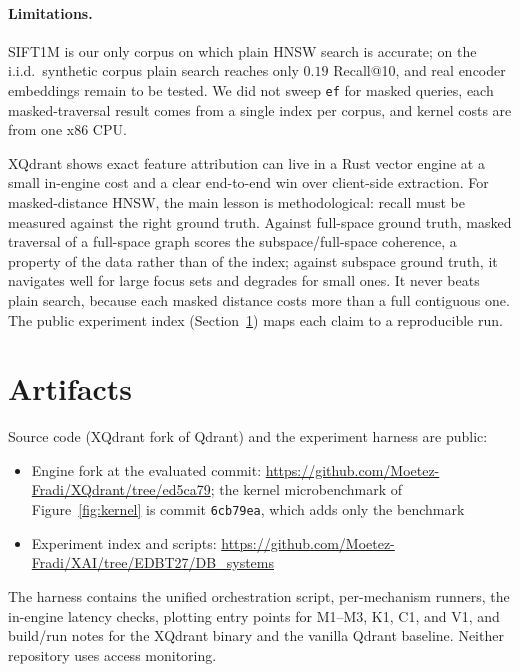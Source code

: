\documentclass[sigconf,review,balance=false]{acmart}
\begin{document}
\paragraph{Limitations.} SIFT1M is our only corpus on which plain HNSW
search is accurate; on the i.i.d.\ synthetic corpus plain search reaches only
$0.19$ Recall@10, and real encoder embeddings remain to be tested. We did not
sweep \texttt{ef} for masked queries, each masked-traversal result comes
from a single index per corpus, and kernel costs are from one x86 CPU.

XQdrant shows exact feature attribution can live in a Rust vector engine at a
small in-engine cost and a clear end-to-end win over client-side extraction.
For masked-distance HNSW, the main lesson is methodological: recall must be
measured against the right ground truth. Against full-space ground truth,
masked traversal of a full-space graph scores the subspace/full-space
coherence, a property of the data rather than of the index; against subspace
ground truth, it navigates well for large focus sets and degrades for small
ones. It never beats plain search, because each masked distance costs more
than a full contiguous one. The public experiment index
(Section~\ref{sec:artifacts}) maps each claim to a reproducible run.

\section{Artifacts}
\label{sec:artifacts}

Source code (XQdrant fork of Qdrant) and the experiment harness are public:
\begin{itemize}
  \setlength{\itemsep}{0.15em}
  \setlength{\parsep}{0pt}
  \item Engine fork at the evaluated commit:
    \url{https://github.com/Moetez-Fradi/XQdrant/tree/ed5ca79}; the kernel
    microbenchmark of Figure~\ref{fig:kernel} is commit \texttt{6cb79ea},
    which adds only the benchmark
  \item Experiment index and scripts:
    \url{https://github.com/Moetez-Fradi/XAI/tree/EDBT27/DB_systems}
\end{itemize}
The harness contains the unified orchestration script, per-mechanism runners,
the in-engine latency checks, plotting entry points for M1--M3, K1, C1, and
V1, and build/run notes for the XQdrant binary and the vanilla Qdrant
baseline. Neither repository uses access
monitoring.



\end{document}
